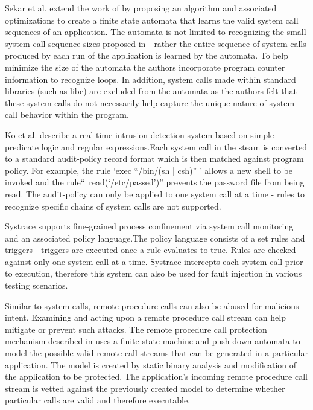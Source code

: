 Sekar et al.\cite{DBLP:conf/sp/SekarBDB01} extend the work of \cite{DBLP:conf/sp/ForrestHSL96} by proposing an algorithm and associated optimizations to create a finite state automata that
learns the valid system call sequences of an application. The automata is not
limited to recognizing the small system call sequence sizes proposed in
 \cite{DBLP:conf/sp/ForrestHSL96} - rather the entire sequence of system calls produced by each
run of the application is learned by the automata. To help minimize the size of
the automata the authors incorporate program counter information to recognize
loops. In addition, system calls made within standard libraries (such as libc)
are excluded from the automata as the authors felt that these system calls do not
necessarily help capture the unique nature of system call behavior within the
program.

Ko et al.\cite{DBLP:conf/acsac/KoFL94} describe a real-time intrusion detection system
based on simple predicate logic and regular expressions.Each system call in the
steam is converted to a standard audit-policy record format which is then
matched against program policy. For example, the rule ‘exec “/bin/(sh | csh)” ’
allows a new shell to be invoked and the rule“~read(‘/etc/passed’)” prevents the
password file from being read. The audit-policy can only be applied to one
system call at a time - rules to recognize specific chains of system calls are
not supported.

Systrace\cite{DBLP:conf/uss/Provos03} supports fine-grained process confinement
via system call monitoring and an associated policy language.The policy language
consists of a set rules and triggers - triggers are executed once a rule
evaluates to true. Rules are checked against only one system call at a time.
Systrace intercepts each system call prior to execution, therefore this system
can also be used for fault injection in various testing scenarios.

Similar to system calls, remote procedure calls can also be abused for malicious
intent. Examining and acting upon a remote procedure call stream can help
mitigate or prevent such attacks. The remote procedure call protection mechanism
described in \cite{DBLP:conf/uss/GiffinJM02} uses a finite-state machine and push-down automata
to model the possible valid remote call streams that can be generated in a
particular application. The model is created by static binary analysis
and modification of the application to be protected. The application's incoming
remote procedure call stream is vetted against the previously created model to
determine whether particular calls are valid and therefore
executable.

